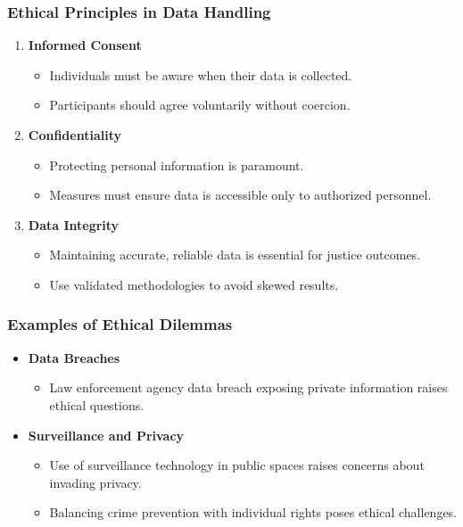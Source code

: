 \documentclass[aspectratio=169]{beamer}
\begin{document}
\begin{frame}[fragile]
    \frametitle{Ethical Principles in Data Handling}
    \begin{enumerate}
        \item \textbf{Informed Consent}
        \begin{itemize}
            \item Individuals must be aware when their data is collected.
            \item Participants should agree voluntarily without coercion.
        \end{itemize}

        \item \textbf{Confidentiality}
        \begin{itemize}
            \item Protecting personal information is paramount.
            \item Measures must ensure data is accessible only to authorized personnel.
        \end{itemize}

        \item \textbf{Data Integrity}
        \begin{itemize}
            \item Maintaining accurate, reliable data is essential for justice outcomes.
            \item Use validated methodologies to avoid skewed results.
        \end{itemize}
    \end{enumerate}
\end{frame}

\begin{frame}[fragile]
    \frametitle{Examples of Ethical Dilemmas}
    \begin{itemize}
        \item \textbf{Data Breaches}
        \begin{itemize}
            \item Law enforcement agency data breach exposing private information raises ethical questions.
        \end{itemize}

        \item \textbf{Surveillance and Privacy}
        \begin{itemize}
            \item Use of surveillance technology in public spaces raises concerns about invading privacy.
            \item Balancing crime prevention with individual rights poses ethical challenges.
        \end{itemize}
    \end{itemize}
\end{frame}
\end{document}
